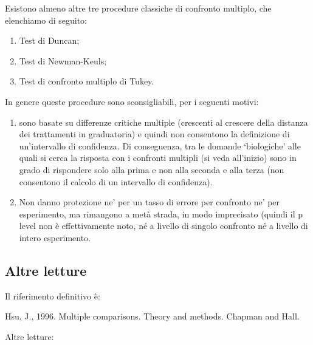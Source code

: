\documentclass[a4paper,12pt,oneside]{book}
\providecommand{\tightlist}{%
  \setlength{\itemsep}{0pt}\setlength{\parskip}{0pt}}
\begin{document}
Esistono almeno altre tre procedure classiche di confronto multiplo, che elenchiamo di seguito:

\begin{enumerate}
\def\labelenumi{\arabic{enumi}.}
\tightlist
\item
  Test di Duncan;
\item
  Test di Newman-Keuls;
\item
  Test di confronto multiplo di Tukey.
\end{enumerate}

In genere queste procedure sono sconsigliabili, per i seguenti motivi:

\begin{enumerate}
\def\labelenumi{\arabic{enumi}.}
\tightlist
\item
  sono basate su differenze critiche multiple (crescenti al crescere della distanza dei trattamenti in graduatoria) e quindi non consentono la definizione di un'intervallo di confidenza. Di conseguenza, tra le domande `biologiche' alle quali si cerca la risposta con i confronti multipli (si veda all'inizio) sono in grado di rispondere solo alla prima e non alla seconda e alla terza (non consentono il calcolo di un intervallo di confidenza).
\item
  Non danno protezione ne' per un tasso di errore per confronto ne' per esperimento, ma rimangono a metà strada, in modo imprecisato (quindi il p level non è effettivamente noto, né a livello di singolo confronto né a livello di intero esperimento.
\end{enumerate}

\hypertarget{altre-letture-4}{%
\subsection{Altre letture}\label{altre-letture-4}}

Il riferimento definitivo è:

Hsu, J., 1996. Multiple comparisons. Theory and methods. Chapman and Hall.

Altre letture:
\end{document}
